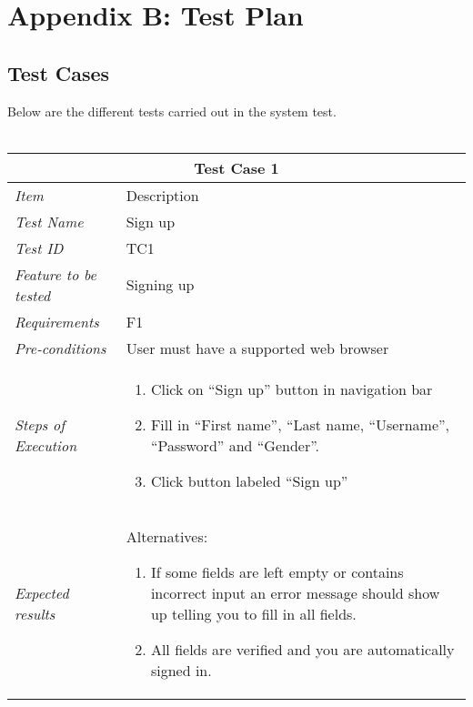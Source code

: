 


\chapter{Appendix B: Test Plan}
\label{chap:TestingTPlan}


\section{Test Cases}
\label{sec:TestCases}

Below are the different tests carried out in the system test. \\ \\
%
\begin{minipage}{\linewidth}
\setlength{\tabcolsep}{15pt}
\centering
{}
\begin{tabular}{ |l|p{70mm}| }
	\hline
	\multicolumn{2}{|c|}{\cellcolor{gray!25} \textbf{Test Case 1}} \\
	\hline
	\it{\cellcolor{gray!25}Item} & {\cellcolor{gray!25} Description } \\
	\hline
	\it{\cellcolor{gray!25}Test Name } & Sign up \\ \hline
	\it{\cellcolor{gray!25}Test ID} & TC1 \\ \hline
	\it{\cellcolor{gray!25}Feature to be tested} & Signing up \\ \hline
	\it{\cellcolor{gray!25}Requirements} & F1  \\ \hline
	\it{\cellcolor{gray!25}Pre-conditions} & User must have a supported web browser  \\ \hline
	\it{\cellcolor{gray!25}Steps of Execution} & \begin{enumerate}
	                                       \item Click on “Sign up” button in navigation bar
	                                       \item Fill in “First name”, “Last name, “Username”, “Password” and “Gender”.
	                                       \item Click button labeled “Sign up”
	                                     \end{enumerate} \\ \hline
	\it{\cellcolor{gray!25}Expected results} & Alternatives: 
	\begin{enumerate}[label=\alph*)]
	                                       \item If some fields are left empty or contains incorrect input an error message should show up telling you to fill in all fields.
	                                       \item All fields are verified and you are automatically signed in.
	                                     \end{enumerate} \\
	\hline
\end{tabular}
\medskip
\end{minipage}
